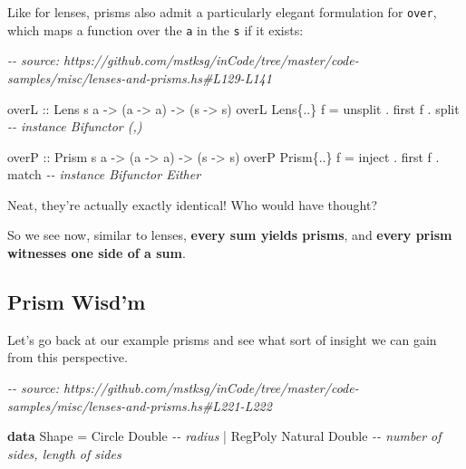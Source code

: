 \documentclass[]{article}
\newenvironment{Shaded}{}{}
\newcommand{\CommentTok}[1]{\textcolor[rgb]{0.38,0.63,0.69}{\textit{#1}}}
\newcommand{\DataTypeTok}[1]{\textcolor[rgb]{0.56,0.13,0.00}{#1}}
\newcommand{\KeywordTok}[1]{\textcolor[rgb]{0.00,0.44,0.13}{\textbf{#1}}}
\newcommand{\NormalTok}[1]{#1}
\newcommand{\OperatorTok}[1]{\textcolor[rgb]{0.40,0.40,0.40}{#1}}
\newcommand{\OtherTok}[1]{\textcolor[rgb]{0.00,0.44,0.13}{#1}}
\begin{document}
Like for lenses, prisms also admit a particularly elegant formulation for
\texttt{over}, which maps a function over the \texttt{a} in the \texttt{s} if it
exists:

\begin{Shaded}
\begin{Highlighting}[]
\CommentTok{{-}{-} source: https://github.com/mstksg/inCode/tree/master/code{-}samples/misc/lenses{-}and{-}prisms.hs\#L129{-}L141}

\OtherTok{overL ::} \DataTypeTok{Lens\textquotesingle{}}\NormalTok{ s a }\OtherTok{{-}\textgreater{}}\NormalTok{ (a }\OtherTok{{-}\textgreater{}}\NormalTok{ a) }\OtherTok{{-}\textgreater{}}\NormalTok{ (s }\OtherTok{{-}\textgreater{}}\NormalTok{ s)}
\NormalTok{overL }\DataTypeTok{Lens\textquotesingle{}}\NormalTok{\{}\OperatorTok{..}\NormalTok{\}  f }\OtherTok{=}\NormalTok{ unsplit }\OperatorTok{.}\NormalTok{ first f }\OperatorTok{.}\NormalTok{ split   }\CommentTok{{-}{-} instance Bifunctor (,)}

\OtherTok{overP ::} \DataTypeTok{Prism\textquotesingle{}}\NormalTok{ s a }\OtherTok{{-}\textgreater{}}\NormalTok{ (a }\OtherTok{{-}\textgreater{}}\NormalTok{ a) }\OtherTok{{-}\textgreater{}}\NormalTok{ (s }\OtherTok{{-}\textgreater{}}\NormalTok{ s)}
\NormalTok{overP }\DataTypeTok{Prism\textquotesingle{}}\NormalTok{\{}\OperatorTok{..}\NormalTok{\} f }\OtherTok{=}\NormalTok{ inject }\OperatorTok{.}\NormalTok{ first f }\OperatorTok{.}\NormalTok{ match    }\CommentTok{{-}{-} instance Bifunctor Either}
\end{Highlighting}
\end{Shaded}

Neat, they're actually exactly identical! Who would have thought?

So we see now, similar to lenses, \textbf{every sum yields prisms}, and
\textbf{every prism witnesses one side of a sum}.

\subsection{Prism Wisd'm}\label{prism-wisdm}

Let's go back at our example prisms and see what sort of insight we can gain
from this perspective.

\begin{Shaded}
\begin{Highlighting}[]
\CommentTok{{-}{-} source: https://github.com/mstksg/inCode/tree/master/code{-}samples/misc/lenses{-}and{-}prisms.hs\#L221{-}L222}

\KeywordTok{data} \DataTypeTok{Shape} \OtherTok{=} \DataTypeTok{Circle}  \DataTypeTok{Double}           \CommentTok{{-}{-} radius}
           \OperatorTok{|} \DataTypeTok{RegPoly} \DataTypeTok{Natural} \DataTypeTok{Double}   \CommentTok{{-}{-} number of sides, length of sides}
\end{Highlighting}
\end{Shaded}
\end{document}
